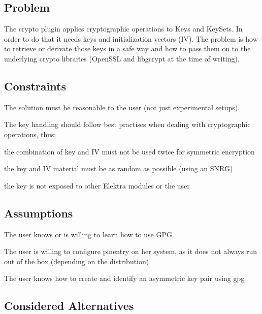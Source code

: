 \subsection*{Problem}

The crypto plugin applies cryptographic operations to Keys and Key\+Sets. In order to do that it needs keys and initialization vectors (IV). The problem is how to retrieve or derivate those keys in a safe way and how to pass them on to the underlying crypto libraries (Open\+S\+SL and libgcrypt at the time of writing).

\subsection*{Constraints}

The solution must be reasonable to the user (not just experimental setups).

The key handling should follow best practises when dealing with cryptographic operations, thus\+:


\begin{DoxyItemize}
\item the combination of key and IV must not be used twice for symmetric encryption
\item the key and IV material must be as random as possible (using an S\+N\+RG)
\item the key is not exposed to other Elektra modules or the user
\end{DoxyItemize}

\subsection*{Assumptions}


\begin{DoxyItemize}
\item The user knows or is willing to learn how to use G\+PG.
\item The user is willing to configure {\ttfamily pinentry} on her system, as it does not always run out of the box (depending on the distribution)
\item The user knows how to create and identify an asymmetric key pair using {\ttfamily gpg}
\end{DoxyItemize}

\subsection*{Considered Alternatives}

